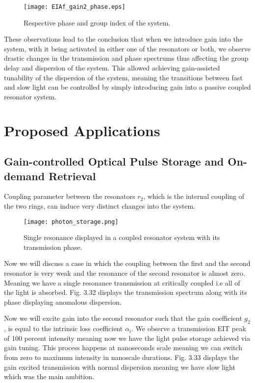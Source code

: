 \begin{figure}[h]
\centering
\texttt{[image: EIAf\_gain2\_phase.eps]}
\caption{Respective phase and group index of the system.}
\end{figure}

These observations lead to the conclusion that when we introduce gain into the system, with it being activated in either one of the resonators or both, we observe drastic changes in the transmission and phase spectrums thus affecting the group delay and dispersion of the system. This allowed achieving gain-assisted tunability of the dispersion of the system, meaning the transitions between fast and slow light can be controlled by simply introducing gain into a passive coupled resonator system.


\section{Proposed Applications}
\subsection{Gain-controlled Optical Pulse Storage and On-demand Retrieval}
Coupling parameter between the resonators $r_{2}$, which is the internal coupling of the two rings, can induce very distinct changes into the system.

\begin{figure}[h]
\centering 
\texttt{[image: photon\_storage.png]}
\caption{Single resonance displayed in a coupled resonator system with its transmission phase.}
\end{figure}

Now we will discuss a case in which the coupling between the first and the second resonator is very weak and the resonance of the second resonator is almost zero. Meaning we have a single resonance transmission at critically coupled i.e all of the light is absorbed. Fig. 3.32 displays the transmission spectrum along with its phase displaying anomalous dispersion. 

Now we will excite gain into the second resonator such that the gain coefficient $g_{2}$, is equal to the intrinsic loss coefficient $\alpha_{i}$. We observe a transmission EIT peak of 100 percent intensity meaning now we have the light pulse storage achieved via gain tuning. This process happens at nanoseconds scale meaning we can switch from zero to maximum intensity in nanoscale durations. Fig. 3.33 displays the gain excited transmission with normal dispersion meaning we have slow light which was the main ambition.


